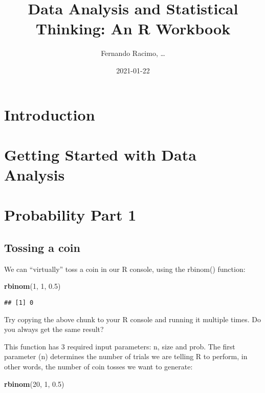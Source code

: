 \documentclass[
]{book}
\title{Data Analysis and Statistical Thinking: An R Workbook}
\author{Fernando Racimo, \ldots{}}
\date{2021-01-22}
\newenvironment{Shaded}{\begin{snugshade}}{\end{snugshade}}
\newcommand{\DecValTok}[1]{\textcolor[rgb]{0.00,0.00,0.81}{#1}}
\newcommand{\FloatTok}[1]{\textcolor[rgb]{0.00,0.00,0.81}{#1}}
\newcommand{\KeywordTok}[1]{\textcolor[rgb]{0.13,0.29,0.53}{\textbf{#1}}}
\newcommand{\NormalTok}[1]{#1}
\begin{document}
\maketitle

{
\setcounter{tocdepth}{1}
\tableofcontents
}
\hypertarget{introduction}{%
\chapter{Introduction}\label{introduction}}

\hypertarget{intro}{%
\chapter{Getting Started with Data Analysis}\label{intro}}

\hypertarget{prob1}{%
\chapter{Probability Part 1}\label{prob1}}

\hypertarget{tossing-a-coin}{%
\section{Tossing a coin}\label{tossing-a-coin}}

We can ``virtually'' toss a coin in our R console, using the rbinom() function:

\begin{Shaded}
\begin{Highlighting}[]
\KeywordTok{rbinom}\NormalTok{(}\DecValTok{1}\NormalTok{, }\DecValTok{1}\NormalTok{, }\FloatTok{0.5}\NormalTok{)}
\end{Highlighting}
\end{Shaded}

\begin{verbatim}
## [1] 0
\end{verbatim}

Try copying the above chunk to your R console and running it multiple times. Do you always get the same result?

This function has 3 required input parameters: n, size and prob. The first parameter (n) determines the number of trials we are telling R to perform, in other words, the number of coin tosses we want to generate:

\begin{Shaded}
\begin{Highlighting}[]
\KeywordTok{rbinom}\NormalTok{(}\DecValTok{20}\NormalTok{, }\DecValTok{1}\NormalTok{, }\FloatTok{0.5}\NormalTok{)}
\end{Highlighting}
\end{Shaded}
\end{document}
